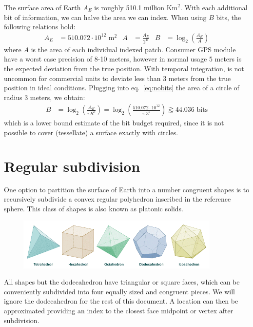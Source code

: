 \documentclass{article}
\begin{document}
The surface area of Earth $A_E$ is roughly 510.1 million $\text{Km}^2$.
With each additional bit of information, we can halve the area we can index.
When using $B$ bits, the following relations hold:
%
\begin{align}
A_E &= 510.072 \cdot 10^{12} \text{ m}^2 &
A &= \frac{A_E}{2^B} &
B &= \log_2 \left( \frac{A_E}{A} \right)
\label{eq:nobits}
\end{align}
%
where $A$ is the area of each individual indexed patch.
Consumer GPS module have a worst case precision of 8-10 meters, however in normal usage 5 meters is the expected deviation from the true position. With temporal integration, is not uncommon for commercial units to deviate less than 3 meters from the true position in ideal conditions. Plugging into eq.~\ref{eq:nobits} the area of a circle of radius 3 meters, we obtain:
%
\begin{align*}
B &= \log_2 \left( \frac{A_E}{\pi R^2} \right) = \log_2 \left( \frac{510.072 \cdot 10^{12}}{\pi \; 3^2} \right) \gtrapprox 44.036 \text{ bits}
\end{align*}
%
which is a lower bound estimate of the bit budget required, since it is not possible to cover (tessellate) a surface exactly with circles.

\section{Regular subdivision}

One option to partition the surface of Earth into a number congruent shapes is to recursively subdivide a convex regular polyhedron inscribed in the reference sphere. This class of shapes is also known as platonic solids.
%
\begin{figure}[htb]
\centering
\includegraphics[width=0.9\textwidth]{platonic.png}
\end{figure}
%
All shapes but the dodecahedron have triangular or square faces, which can be conveniently subdivided into four equally sized and congruent pieces. We will ignore the dodecahedron for the rest of this document. A location can then be approximated providing an index to the closest face midpoint or vertex after subdivision.
\end{document}
